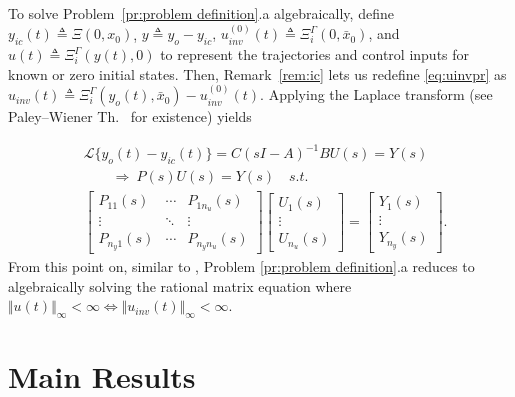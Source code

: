 \documentclass[10pt,a4paper]{amsart}
\theoremstyle{remark}
\begin{document}
To solve Problem~\ref{pr:problem definition}.a algebraically, define 
\(y_{ic}(t) \triangleq \Xi(0, x_0)\), {$y \triangleq y_o-y_{ic}$, 
\(u_{inv}^{(0)}(t) \triangleq \Xi_i^\Gamma(0, \bar{x}_0)\), 
and \(u(t) \triangleq \Xi_i^\Gamma(y(t), 0)\) 
to represent the trajectories and control inputs for known or zero initial states. 
Then, Remark~\ref{rem:ic} lets us redefine \eqref{eq:uinvpr} as
\(u_{inv}(t) \triangleq \Xi_{i}^\Gamma(y_o(t),\bar{x}_0) - u_{inv}^{(0)}(t)\).} Applying the Laplace transform (see Paley--Wiener Th.\ \cite[p.~104]{hoffman2007banach} for existence) yields

\begin{align}
&\mathscr{L} \{ y_o(t) - {y}_{ic}(t)\} = {C}(s{I}-{A})^{-1}{B}U(s) =Y(s) \label{eq:TFM}\\
& \quad \quad \Rightarrow \ P(s)U(s)=Y(s) \quad s.t. \label{eq:algebraic equation} \\   
&\begin{bmatrix} 
P_{11}(s) & \cdots & P_{1n_u}(s) \\
\vdots & \ddots & \vdots \\
P_{n_y1}(s) & \cdots & P_{n_yn_u}(s)
\end{bmatrix}
\begin{bmatrix}
U_1(s) \\
\vdots \\
U_{n_u}(s)
\end{bmatrix}
=
\begin{bmatrix}
Y_1(s) \\
\vdots \\
Y_{n_y}(s)
\end{bmatrix}. \label{eq:algebraic equation2}
\end{align}
From this point on, similar to \cite[Theorem 8.5.2]{wolovich2012linear}, Problem \ref{pr:problem definition}.a reduces to algebraically solving the rational matrix equation where $\Vert u(t) \Vert_\infty < \infty \iff \Vert u_{inv}(t) \Vert_\infty < \infty$.
\section{Main Results} \label{sec:Main}
\end{document}
